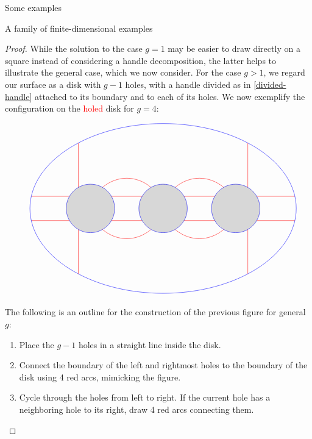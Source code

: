 \begin{chapter}{Some examples}
\begin{section}{A family of finite-dimensional examples}
\begin{proof}

While the solution to the case $g=1$ may be easier to draw directly on a square instead of considering a handle decomposition, the latter helps to illustrate the general case, which we now consider. For the case $g>1$, we regard our surface as a disk with $g-1$ holes, with a handle divided as in \ref{divided-handle} attached to its boundary and to each of its holes. We now exemplify the configuration on the \textcolor{red}{holed} disk for $g=4$:

\begin{figure}[h]
\[
\begin{tikzpicture}
\draw[red] (-5.44, 0.5) -- (-3.87, 0.5);
\draw[red] (-5.44, -0.5) -- (-3.87, -0.5);
\draw[red] (5.44, 0.5) -- (3.87, 0.5);
\draw[red] (5.44, -0.5) -- (3.87, -0.5);

\draw[red] (-3.5,0.87) -- (-3.5,2.7);
\draw[red] (-3.5,-0.87) -- (-3.5,-2.7);
\draw[red] (3.5,0.87) -- (3.5,2.7);
\draw[red] (3.5,-0.87) -- (3.5,-2.7);

\draw[red] (-2.137, 0.5) -- (-0.863, 0.5);
\draw[red] (-2.137, -0.5) -- (-0.863, -0.5);
\draw[red] (2.137, 0.5) -- (0.863, 0.5);
\draw[red] (2.137, -0.5) -- (0.863, -0.5);

\draw[red] (-2.5,0.87) to [bend left=40] (-0.5,0.87);
\draw[red] (2.5,0.87) to [bend right=40] (0.5,0.87);
\draw[red] (-2.5,-0.87) to [bend right=40] (-0.5,-0.87);
\draw[red] (2.5,-0.87) to [bend left=40] (0.5,-0.87);

\draw[blue] (0,0) ellipse (5.5cm and 3.5cm);
\draw[blue] (0,0) circle (1cm);
\draw[blue] (-3,0) circle (1cm);
\draw[blue] (3,0) circle (1cm);
\fill [black,opacity=.15] (-3,0) circle (1cm);
\fill [black,opacity=.15] (0,0) circle (1cm);
\fill [black,opacity=.15] (3,0) circle (1cm);
\end{tikzpicture}
\]
\end{figure}

The following is an outline for the construction of the previous figure for general $g$:
\begin{enumerate}
\item Place the $g-1$ holes in a straight line inside the disk.
\item Connect the boundary of the left and rightmost holes to the boundary of the disk using 4 red arcs, mimicking the figure.
\item Cycle through the holes from left to right. If the current hole has a neighboring hole to its right, draw 4 red arcs connecting them.
\end{enumerate}


\end{proof}
\end{section}
\end{chapter}
